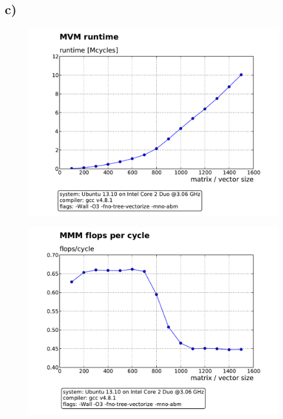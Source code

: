 \documentclass[11pt]{article}
\begin{document}
		\subsection*{c)}
			\begin{figure}[H]
				\includegraphics[width = 6in]{MVM_runtimeO3.pdf}
			\end{figure}
			\begin{figure}[H]
				\includegraphics[width = 6in]{MVM_flopsO3.pdf}
			\end{figure}
\end{document}
